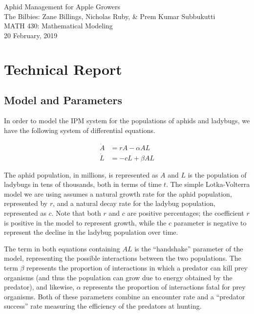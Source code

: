 \documentclass[10pt]{article}
\newcommand{\np}{\vfill\newpage}
\begin{document}

\begin{center}
    \LARGE{Aphid Management for Apple Growers} \\
    \vspace{0.15in} 
    \large{The Bilbies: Zane Billings, Nicholas Ruby, \& Prem Kumar Subbukutti} \\
    \large{MATH 430: Mathematical Modeling} \\
    \large{20 February, 2019} \\
    \vspace{0.25in}
\end{center}


\tableofcontents
\np


\section{Technical Report}

\subsection{Model and Parameters}

In order to model the IPM system for the populations of aphids and ladybugs, we have the following system of differential equations.

\begin{align}
\dot{A} &= rA - \alpha A L \label{eq:basicA}\\
\dot{L} &= -cL + \beta A L \label{eq:basicL}
\end{align}

The aphid population, in millions, is represented as \(A\) and \(L\) is the population of ladybugs in tens of thousands, both in terms of time \(t\). The simple Lotka-Volterra model we are using assumes a natural growth rate for the aphid population, represented by \(r\), and a natural decay rate for the ladybug population, represented as \(c\). Note that both \(r\) and \(c\) are positive percentages; the coefficient \(r\) is positive in the model to represent growth, while the \(c\) parameter is negative to represent the decline in the ladybug population over time. 

The term in both equations containing \(AL\) is the ``handshake'' parameter of the model, representing the possible interactions between the two populations. The term \(\beta\) represents the proportion of interactions in which a predator can kill prey organisms (and thus the population can grow due to energy obtained by the predator), and likewise, \(\alpha\) represents the proportion of interactions fatal for prey organisms. Both of these parameters combine an encounter rate and a ``predator success'' rate measuring the efficiency of the predators at hunting.
\end{document}
